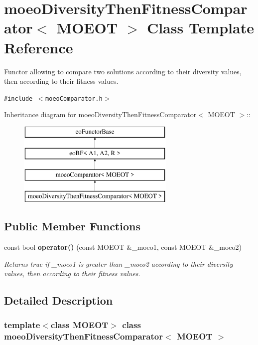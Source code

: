 \section{moeo\-Diversity\-Then\-Fitness\-Comparator$<$ MOEOT $>$ Class Template Reference}
\label{classmoeoDiversityThenFitnessComparator}
Functor allowing to compare two solutions according to their diversity values, then according to their fitness values.  


{\tt \#include $<$moeo\-Comparator.h$>$}

Inheritance diagram for moeo\-Diversity\-Then\-Fitness\-Comparator$<$ MOEOT $>$::\begin{figure}[H]
\begin{center}
\leavevmode
\includegraphics[height=4cm]{classmoeoDiversityThenFitnessComparator}
\end{center}
\end{figure}
\subsection*{Public Member Functions}
\begin{CompactItemize}
\item 
const bool {\bf operator()} (const MOEOT \&\_\-moeo1, const MOEOT \&\_\-moeo2)
\begin{CompactList}\small\item\em Returns true if \_\-moeo1 is greater than \_\-moeo2 according to their diversity values, then according to their fitness values. \item\end{CompactList}\end{CompactItemize}


\subsection{Detailed Description}
\subsubsection*{template$<$class MOEOT$>$ class moeo\-Diversity\-Then\-Fitness\-Comparator$<$ MOEOT $>$}

